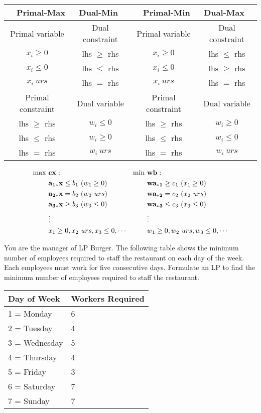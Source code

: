 \begin{center} \begin{tabular} {|c|c||c|c|} \hline
\multicolumn{2}{|c||}{Primal-Max~~~Dual-Min} 	& \multicolumn{2}{|c|}{Primal-Min~~~Dual-Max} \\ \hline
Primal variable 		& Dual constraint & Primal variable & Dual constraint \\
$x_i \ge 0$ 			& lhs $\ge$ rhs 		& $x_i \ge 0$ 	&  lhs $\le$ rhs \\
$x_i \le 0$ 			& lhs $\le$ rhs 		& $x_i \le 0$ 	&  lhs $\ge$ rhs\\
$x_i~urs$ 				& lhs $=$ rhs 		& $x_i~urs$ 	&  lhs $=$ rhs \\ \hline
Primal constraint		& Dual variable  & Primal constraint& Dual variable \\ 
lhs $\ge$ rhs 		& $w_i \le 0$ &  lhs $\ge$ rhs   & $w_i \ge 0$  \\
lhs $\le$ rhs  & $w_i \ge 0$      & lhs $\le$ rhs   & $w_i \le 0$\\
lhs $=$ rhs    & $w_i~urs$ & lhs $=$ rhs    &  $w_i~urs$\\ \hline
\end{tabular} \end{center}

\begin{align*}
\max~& {\bf cx}:~~~~~~~~~~~~			& \min~ & {\bf wb}:  \\
&{\bf a_{1*}x} \le b_1~(w_1 \ge 0)   &     & {\bf wa_{*1}} \ge c_1~(x_1 \ge 0) \\ 
&{\bf a_{2*}x} = b_2~(w_2~urs)       &     & {\bf wa_{*2}} = c_2~(x_2~urs) \\
&{\bf a_{3*}x} \ge b_3~(w_3 \le 0) &        & {\bf wa_{*3}} \le c_3~(x_3 \le 0) \\
&\vdots 							   &      & \vdots \\ 
&x_1 \ge 0, x_2~urs, x_3 \le 0, \cdots &  	 & w_1 \ge 0, w_2~urs, w_3 \le 0,\cdots   
\end{align*}


 You are the manager of LP Burger. The following table shows the minimum number of employees required to staff the restaurant on each day of the week. Each employees must work for five consecutive days. Formulate an LP to find the minimum number of employees required to staff the restaurant.

\begin{table}[h!] \begin{center} \begin{tabular} {|l|l|} 
\hline Day of Week & Workers Required   \\ \hline
\hline  1 = Monday & 6  \\
\hline  2 = Tuesday & 4  \\
\hline  3 = Wednesday & 5  \\
\hline  4 = Thursday & 4  \\
\hline  5 = Friday & 3  \\
\hline  6 = Saturday & 7  \\
\hline  7 = Sunday & 7  \\
\hline \end{tabular} \end{center} \end{table}

